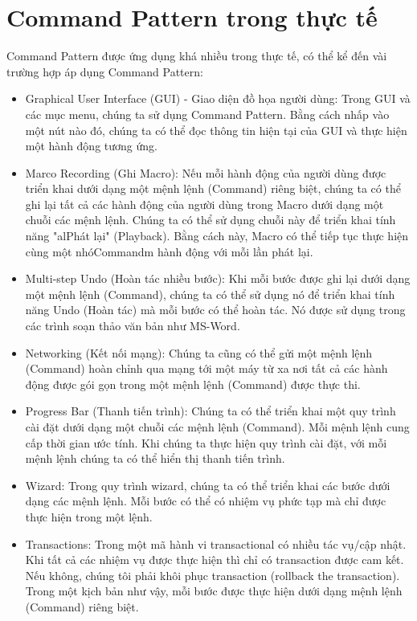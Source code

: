 \section{Command Pattern trong thực tế}
Command Pattern được ứng dụng khá nhiều trong thực tế, có thể kể đến vài trường hợp áp dụng Command Pattern:
\begin{itemize}
	\item Graphical User Interface (GUI) - Giao diện đồ họa người dùng: Trong GUI và các mục menu, chúng ta sử dụng Command Pattern. Bằng cách nhấp vào một nút nào đó, chúng ta có thể đọc thông tin hiện tại của GUI và thực hiện một hành động tương ứng.
	\item Marco Recording (Ghi Macro): Nếu mỗi hành động của người dùng được triển khai dưới dạng một mệnh lệnh (Command) riêng biệt, chúng ta có thể ghi lại tất cả các hành động của người dùng trong Macro dưới dạng một chuỗi các mệnh lệnh. Chúng ta có thể sử dụng chuỗi này để triển khai tính năng "alPhát lại" (Playback). Bằng cách này, Macro có thể tiếp tục thực hiện cùng một nhóCommandm hành động với mỗi lần phát lại.
	\item Multi-step Undo (Hoàn tác nhiều bước): Khi mỗi bước được ghi lại dưới dạng một mệnh lệnh (Command), chúng ta có thể sử dụng nó để triển khai tính năng Undo (Hoàn tác) mà mỗi bước có thể hoàn tác. Nó được sử dụng trong các trình soạn thảo văn bản như MS-Word.
	\item Networking (Kết nối mạng): Chúng ta cũng có thể gửi một mệnh lệnh (Command) hoàn chỉnh qua mạng tới một máy từ xa nơi tất cả các hành động được gói gọn trong một mệnh lệnh (Command) được thực thi.
	\item Progress Bar (Thanh tiến trình): Chúng ta có thể triển khai một quy trình cài đặt dưới dạng một chuỗi các mệnh lệnh (Command). Mỗi mệnh lệnh cung cấp thời gian ước tính. Khi chúng ta thực hiện quy trình cài đặt, với mỗi mệnh lệnh chúng ta có thể hiển thị thanh tiến trình.
	\item Wizard: Trong quy trình wizard, chúng ta có thể triển khai các bước dưới dạng các mệnh lệnh. Mỗi bước có thể có nhiệm vụ phức tạp mà chỉ được thực hiện trong một lệnh.
	\item Transactions: Trong một mã hành vi transactional có nhiều tác vụ/cập nhật. Khi tất cả các nhiệm vụ được thực hiện thì chỉ có transaction được cam kết. Nếu không, chúng tôi phải khôi phục transaction (rollback the transaction). Trong một kịch bản như vậy, mỗi bước được thực hiện dưới dạng mệnh lệnh (Command) riêng biệt.
\end{itemize}
